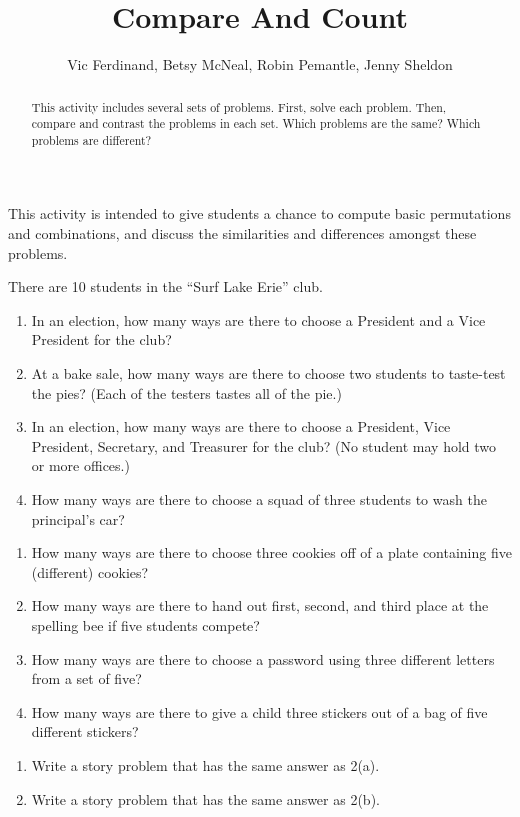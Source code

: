\documentclass{ximera}
\title{Compare And Count}
\author{Vic Ferdinand, Betsy McNeal, Robin Pemantle, Jenny Sheldon}
\begin{document}
\begin{abstract}
This activity includes several sets of problems.  First, solve each problem.  Then, compare and contrast the problems in each set.  Which problems are the same?  Which problems are different?
\end{abstract}
\maketitle

\begin{instructorIntro}
This activity is intended to give students a chance to compute basic permutations and combinations, and discuss the similarities and differences amongst these problems.
\end{instructorIntro}

\begin{problem}
There are 10 students in the ``Surf Lake Erie'' club.
\begin{enumerate}
\item In an election, how many ways are there to choose a President and a Vice President for the club?
\item At a bake sale, how many ways are there to choose two students to taste-test the pies? (Each of the testers tastes all of the pie.)
\item In an election, how many ways are there to choose a President, Vice President, Secretary, and Treasurer for the club?  (No student may hold two or more offices.)
\item How many ways are there to choose a squad of three students to wash the principal's car?

\end{enumerate}
\end{problem}

\begin{problem}
\begin{enumerate}
\item How many ways are there to choose three cookies off of a plate containing five (different) cookies?
\item How many ways are there to hand out first, second, and third place at the spelling bee if five students compete?
\item How many ways are there to choose a password using three different letters from a set of five?
\item How many ways are there to give a child three stickers out of a bag of five different stickers?
\end{enumerate}
\end{problem}


\begin{problem}
\begin{enumerate}
\item Write a story problem that has the same answer as 2(a).
\item Write a story problem that has the same answer as 2(b).
\end{enumerate}
\end{problem}
\end{document}
